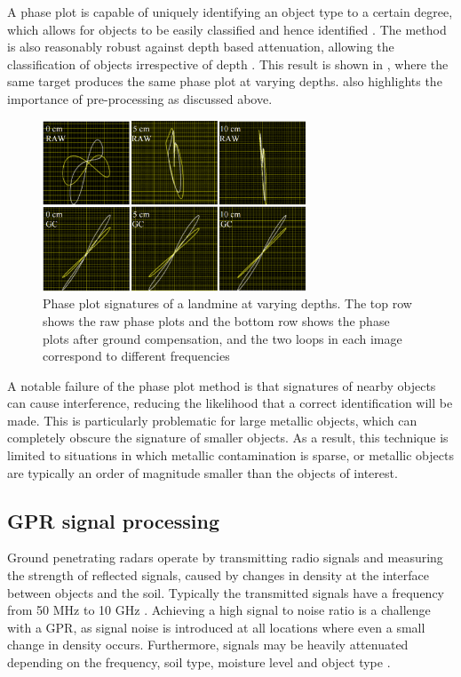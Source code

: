 \documentclass[main.tex]{subfiles}
\begin{document}
A phase plot is capable of uniquely identifying an object type to a certain degree, which allows for objects to be easily classified and hence identified \parencite{bruschini02}. The method is also reasonably robust against depth based attenuation, allowing the classification of objects irrespective of depth \parencite{Kruger2006}. This result is shown in , where the same target produces the same phase plot at varying depths.  also highlights the importance of pre-processing as discussed above.
\begin{figure}[ht]
\includegraphics[width=0.7\textwidth]{2-LiteratureReview/compensated-signature.png}
\centering
\caption[Phase plot signatures of a landmine at varying depths]{Phase plot signatures of a landmine at varying depths. The top row shows the raw phase plots and the bottom row shows the phase plots after ground compensation, and the two loops in each image correspond to different frequencies \parencite{Kruger2006}} 
\end{figure}

A notable failure of the phase plot method is that signatures of nearby objects can cause interference, reducing the likelihood that a correct identification will be made\parencite{Kruger2006}. This is particularly problematic for large metallic objects, which can completely obscure the signature of smaller objects. As a result, this technique is limited to situations in which metallic contamination is sparse, or metallic objects are typically an order of magnitude smaller than the objects of interest.

\subsection{GPR signal processing}
Ground penetrating radars operate by transmitting radio signals and measuring the strength of reflected signals, caused by changes in density at the interface between objects and the soil. Typically the transmitted signals have a frequency from 50 MHz to 10 GHz \parencite{Ho2008}. Achieving a high signal to noise ratio is a challenge with a GPR, as signal noise is introduced at all locations where even a small change in density occurs. Furthermore, signals may be  heavily attenuated depending on the frequency, soil type, moisture level and object type \parencite{Annan20091}. 
\end{document}
